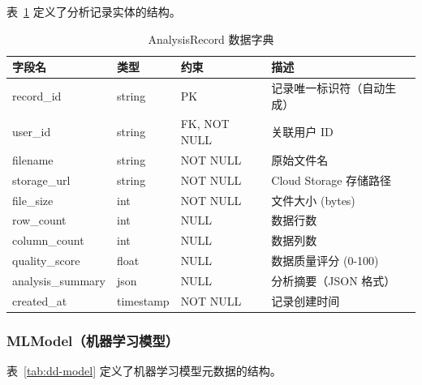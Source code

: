 表~\ref{tab:dd-analysis} 定义了分析记录实体的结构。

\begin{table}[H]
    \centering
    \caption{AnalysisRecord 数据字典}
    \label{tab:dd-analysis}
    \begin{tabularx}{\textwidth}{@{}l l l X@{}}
        \toprule
        \textbf{字段名}      & \textbf{类型} & \textbf{约束}  & \textbf{描述}        \\
        \midrule
        record\_id        & string      & PK           & 记录唯一标识符（自动生成）      \\
        user\_id          & string      & FK, NOT NULL & 关联用户 ID            \\
        filename          & string      & NOT NULL     & 原始文件名              \\
        storage\_url      & string      & NOT NULL     & Cloud Storage 存储路径 \\
        file\_size        & int         & NOT NULL     & 文件大小 (bytes)       \\
        row\_count        & int         & NULL         & 数据行数               \\
        column\_count     & int         & NULL         & 数据列数               \\
        quality\_score    & float       & NULL         & 数据质量评分 (0-100)     \\
        analysis\_summary & json        & NULL         & 分析摘要（JSON 格式）      \\
        created\_at       & timestamp   & NOT NULL     & 记录创建时间             \\
        \bottomrule
    \end{tabularx}
\end{table}

\subsubsection{MLModel（机器学习模型）}

表~\ref{tab:dd-model} 定义了机器学习模型元数据的结构。

